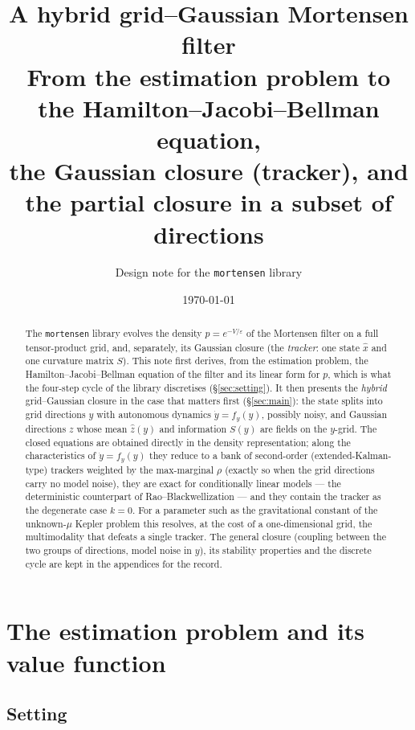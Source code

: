 \documentclass[11pt,a4paper]{article}
\title{A hybrid grid--Gaussian Mortensen filter\\
\large From the estimation problem to the Hamilton--Jacobi--Bellman equation,\\
the Gaussian closure (tracker), and the partial closure in a subset of directions}
\author{Design note for the \texttt{mortensen} library}
\date{\today}
\newcommand{\xh}{\hat{x}}
\newcommand{\zh}{\hat{z}}
\newcommand{\eps}{\varepsilon}
\theoremstyle{plain}
\theoremstyle{definition}
\theoremstyle{remark}
\begin{document}
\maketitle

\begin{abstract}
The \texttt{mortensen} library evolves the density $p=e^{-V/\eps}$ of the Mortensen filter on a full tensor-product grid, and, separately, its Gaussian closure (the \emph{tracker}: one state $\xh$ and one curvature matrix $S$). This note first derives, from the estimation problem, the Hamilton--Jacobi--Bellman equation of the filter and its linear form for $p$, which is what the four-step cycle of the library discretises (\S\ref{sec:setting}). It then presents the \emph{hybrid} grid--Gaussian closure in the case that matters first (\S\ref{sec:main}): the state splits into grid directions $y$ with autonomous dynamics $\dot y=f_y(y)$, possibly noisy, and Gaussian directions $z$ whose mean $\zh(y)$ and information $S(y)$ are fields on the $y$-grid. The closed equations are obtained directly in the density representation; along the characteristics of $\dot y = f_y(y)$ they reduce to a bank of second-order (extended-Kalman-type) trackers weighted by the max-marginal $\rho$ (exactly so when the grid directions carry no model noise), they are exact for conditionally linear models --- the deterministic counterpart of Rao--Blackwellization --- and they contain the tracker as the degenerate case $k=0$. For a parameter such as the gravitational constant of the unknown-$\mu$ Kepler problem this resolves, at the cost of a one-dimensional grid, the multimodality that defeats a single tracker. The general closure (coupling between the two groups of directions, model noise in $y$), its stability properties and the discrete cycle are kept in the appendices for the record.
\end{abstract}

\tableofcontents

\section{The estimation problem and its value function}
\label{sec:setting}

\subsection{Setting}
\end{document}
